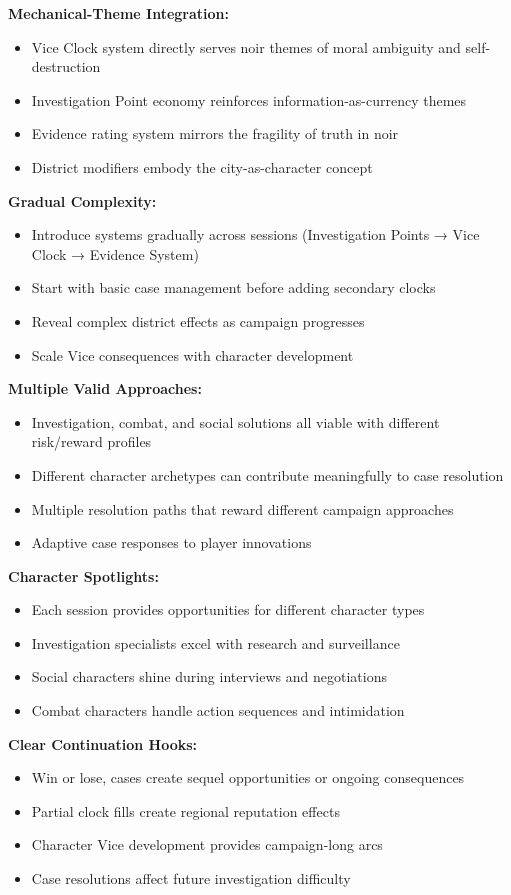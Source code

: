 \documentclass[11pt]{article}
\begin{document}
\textbf{Mechanical-Theme Integration:}
\begin{itemize}
\item Vice Clock system directly serves noir themes of moral ambiguity and self-destruction
\item Investigation Point economy reinforces information-as-currency themes
\item Evidence rating system mirrors the fragility of truth in noir
\item District modifiers embody the city-as-character concept
\end{itemize}

\textbf{Gradual Complexity:}
\begin{itemize}
\item Introduce systems gradually across sessions (Investigation Points → Vice Clock → Evidence System)
\item Start with basic case management before adding secondary clocks
\item Reveal complex district effects as campaign progresses
\item Scale Vice consequences with character development
\end{itemize}

\textbf{Multiple Valid Approaches:}
\begin{itemize}
\item Investigation, combat, and social solutions all viable with different risk/reward profiles
\item Different character archetypes can contribute meaningfully to case resolution
\item Multiple resolution paths that reward different campaign approaches
\item Adaptive case responses to player innovations
\end{itemize}

\textbf{Character Spotlights:}
\begin{itemize}
\item Each session provides opportunities for different character types
\item Investigation specialists excel with research and surveillance
\item Social characters shine during interviews and negotiations
\item Combat characters handle action sequences and intimidation
\end{itemize}

\textbf{Clear Continuation Hooks:}
\begin{itemize}
\item Win or lose, cases create sequel opportunities or ongoing consequences
\item Partial clock fills create regional reputation effects
\item Character Vice development provides campaign-long arcs
\item Case resolutions affect future investigation difficulty
\end{itemize}
\end{document}
